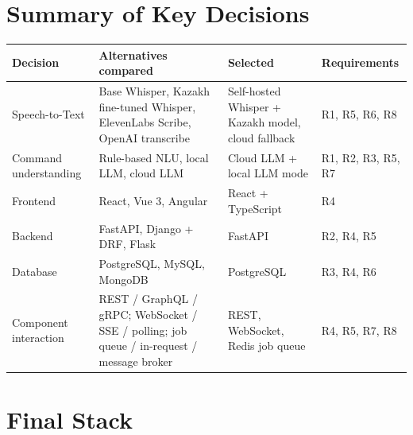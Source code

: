 \documentclass[11pt,a4paper]{article}
\newcommand{\tblstart}{\small\rowcolors{2}{gray!7}{white}}
\begin{document}
\section{Summary of Key Decisions}

{\tblstart
\begin{xltabular}{\textwidth}{P{2.9cm} P{4.8cm} P{3.4cm} L}
\toprule
\textbf{Decision} & \textbf{Alternatives compared} & \textbf{Selected} & \textbf{Requirements} \\
\midrule
\endhead
Speech-to-Text & Base Whisper, Kazakh fine-tuned Whisper, ElevenLabs Scribe, OpenAI transcribe & Self-hosted Whisper + Kazakh model, cloud fallback & R1, R5, R6, R8 \\
Command understanding & Rule-based NLU, local LLM, cloud LLM & Cloud LLM + local LLM mode & R1, R2, R3, R5, R7 \\
Frontend & React, Vue 3, Angular & React + TypeScript & R4 \\
Backend & FastAPI, Django + DRF, Flask & FastAPI & R2, R4, R5 \\
Database & PostgreSQL, MySQL, MongoDB & PostgreSQL & R3, R4, R6 \\
Component interaction & REST / GraphQL / gRPC; WebSocket / SSE / polling; job queue / in-request / message broker & REST, WebSocket, Redis job queue & R4, R5, R7, R8 \\
\bottomrule
\end{xltabular}}

\section{Final Stack}
\end{document}
